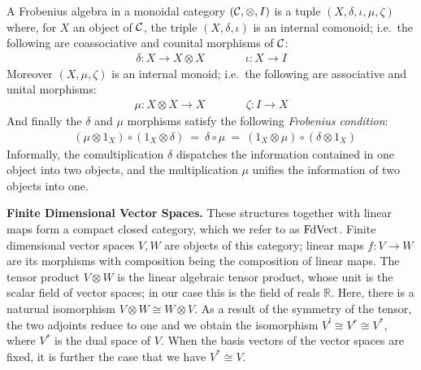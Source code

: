 A Frobenius algebra  in a   monoidal  category $({\cal
  C}, \otimes, I)$ is a tuple $(X,  \delta, \iota, \mu, \zeta)$ where,
for $X$ an object of ${\cal C}$, the triple $(X, \delta, \iota)$ is  an internal comonoid; 
i.e.~the following are  coassociative and counital  morphisms of ${\cal
  C}$:
\begin{align*}
\delta \colon X \to X \otimes X&\qquad& \iota \colon X \to I
\end{align*}
Moreover $(X, \mu, \zeta)$ is  an internal  monoid; i.e.~the following are  associative and unital  morphisms:
\begin{align*}
\mu \colon  X \otimes X \to X  &\qquad& \zeta \colon I \to X
\end{align*}
And finally the  $\delta$ and $\mu$ morphisms satisfy the
following \emph{Frobenius condition}:
\begin{align*}
\mbox{ $(\mu \otimes 1_X) \circ (1_X \otimes \delta) \ = \  \delta \circ \mu  \ = \  (1_X \otimes \mu) \circ (\delta \otimes 1_X)$}
\end{align*}
Informally, the  comultiplication $\delta$  dispatches the information contained in
one object into two objects, and the  multiplication $\mu$ unifies  the
information of two objects into one.




\medskip
\noindent
{\bf Finite Dimensional Vector Spaces.}
These structures  together with  linear maps  form a compact
closed category, which we refer to as $\mathrm{FdVect}$.  Finite dimensional
vector spaces $V, W$ are objects of this category; linear maps $f
\colon V \to W$ are its morphisms with composition being the
composition of linear maps. The tensor product $V
\otimes W$ is the 
linear algebraic tensor product,
whose unit is the scalar
field of vector spaces; in our case this is the field of reals
$\mathbb{R}$.  Here, there is  a naturual
isomorphism $V \otimes W \cong W \otimes V$. As a result of the
symmetry of the tensor, the two adjoints reduce to one and we obtain the  isomorphism $V^l \cong V^r \cong V^*$, 
where $V^*$ is the dual space of $V$. When the
basis vectors of the vector spaces are fixed, it is further the case
that we have $V^* \cong V$.

